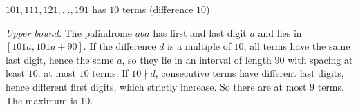 $101,111,121,\dots,191$ has $10$ terms (difference $10$).

\emph{Upper bound.} The palindrome $\overline{aba}$ has first and last digit $a$ and lies in $[101a,101a+90]$. If the difference $d$ is a multiple of $10$, all terms have the same last digit, hence the same $a$, so they lie in an interval of length $90$ with spacing at least $10$: at most $10$ terms. If $10\nmid d$, consecutive terms have different last digits, hence different first digits, which strictly increase. So there are at most $9$ terms. The maximum is $\boxed{10}$.
